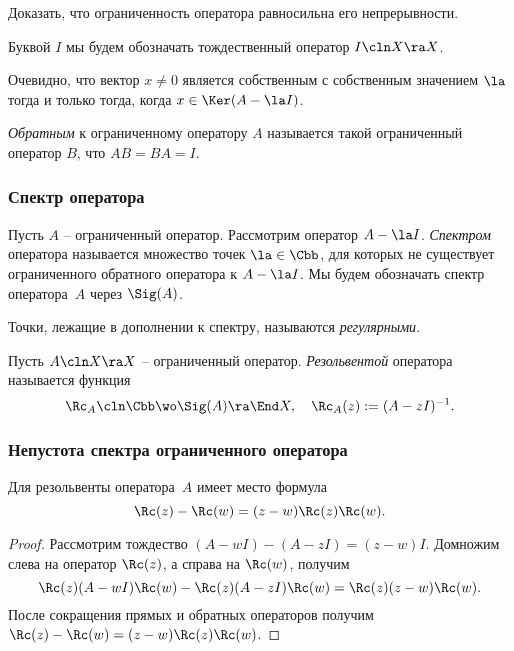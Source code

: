 \documentclass[a4paper]{article}
\begin{document}
\begin{problem}
Доказать, что ограниченность оператора равносильна его непрерывности.
\end{problem}

Буквой $I$ мы будем обозначать тождественный оператор $I\cln X \ra X$.

Очевидно, что вектор $x\neq 0$ является собственным с собственным значением $\la$ тогда и только тогда,
когда $x \in \Ker(A - \la I)$.

\begin{df}
\emph{Обратным} к ограниченному оператору $A$ называется такой
ограниченный оператор $B$, что $AB = BA = I$.
\end{df}

\subsubsection{Спектр оператора}

\begin{df}
Пусть $A$ -- ограниченный оператор. Рассмотрим оператор $A - \la I$.
\emph{Спектром} оператора называется множество точек $\la \in \Cbb$, для которых не существует
ограниченного обратного оператора к $A - \la I$. Мы будем обозначать спектр оператора~$A$ через $\Sig(A)$.
\end{df}

\begin{df}
Точки, лежащие в дополнении к спектру, называются \emph{регулярными}.
\end{df}

\begin{df}
Пусть $A\cln X \ra X$ -- ограниченный оператор.
\emph{Резольвентой} оператора называется функция
$$\Rc_A \cln \Cbb \wo \Sig(A) \ra \End X, \quad \Rc_A(z) := (A - z I)^{-1}.$$
\end{df}

\subsubsection{Непустота спектра ограниченного оператора}

\begin{lemma}
Для резольвенты оператора~$A$ имеет место формула
$$\Rc(z) - \Rc(w) = (z-w)\Rc(z)\Rc(w).$$
\end{lemma}
\begin{proof}
Рассмотрим тождество $(A - w I) - (A - z I) = (z-w)I$. Домножим слева на оператор $\Rc(z)$, а справа на $\Rc(w)$, получим
$$\Rc(z)(A - wI)\Rc(w) - \Rc(z)(A - zI)\Rc(w) = \Rc(z)(z-w)\Rc(w).$$
После сокращения прямых и обратных операторов получим
$\Rc(z) - \Rc(w) = (z-w)\Rc(z)\Rc(w)$.
\end{proof}
\end{document}
